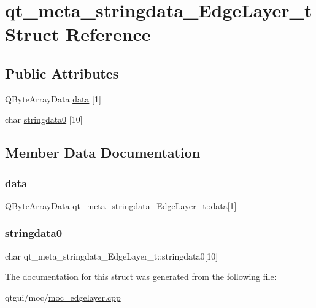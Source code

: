 \hypertarget{structqt__meta__stringdata___edge_layer__t}{}\section{qt\+\_\+meta\+\_\+stringdata\+\_\+\+Edge\+Layer\+\_\+t Struct Reference}
\label{structqt__meta__stringdata___edge_layer__t}
\subsection*{Public Attributes}
\begin{DoxyCompactItemize}
\item 
Q\+Byte\+Array\+Data \mbox{\hyperlink{structqt__meta__stringdata___edge_layer__t_afcf343ad57714993a1c25fec2541ca0b}{data}} \mbox{[}1\mbox{]}
\item 
char \mbox{\hyperlink{structqt__meta__stringdata___edge_layer__t_ae13baddddf523893ac65ad574b9c7905}{stringdata0}} \mbox{[}10\mbox{]}
\end{DoxyCompactItemize}


\subsection{Member Data Documentation}
\mbox{\label{structqt__meta__stringdata___edge_layer__t_afcf343ad57714993a1c25fec2541ca0b}} 
\subsubsection{\texorpdfstring{data}{data}}
{\footnotesize\ttfamily Q\+Byte\+Array\+Data qt\+\_\+meta\+\_\+stringdata\+\_\+\+Edge\+Layer\+\_\+t\+::data\mbox{[}1\mbox{]}}

\mbox{\label{structqt__meta__stringdata___edge_layer__t_ae13baddddf523893ac65ad574b9c7905}} 
\subsubsection{\texorpdfstring{stringdata0}{stringdata0}}
{\footnotesize\ttfamily char qt\+\_\+meta\+\_\+stringdata\+\_\+\+Edge\+Layer\+\_\+t\+::stringdata0\mbox{[}10\mbox{]}}



The documentation for this struct was generated from the following file\+:\begin{DoxyCompactItemize}
\item 
qtgui/moc/\mbox{\hyperlink{moc__edgelayer_8cpp}{moc\+\_\+edgelayer.\+cpp}}\end{DoxyCompactItemize}
